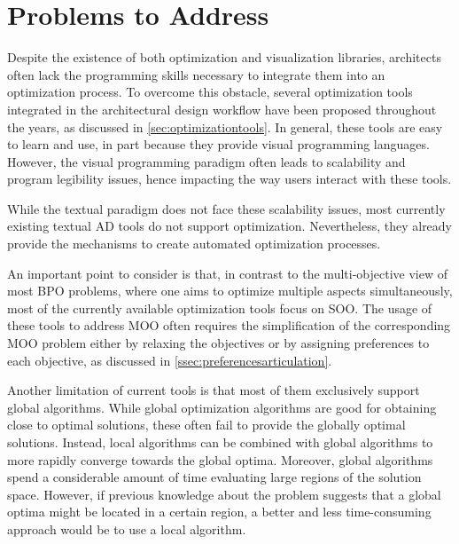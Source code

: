 	\section{Problems to Address}
	\label{sec:problemsaddress}
	
	Despite the existence of both optimization and visualization libraries, architects often lack the programming skills necessary to integrate them into an optimization process. To overcome this obstacle, 
	several optimization tools integrated in the architectural design workflow have been proposed throughout the years, as discussed in \cref{sec:optimizationtools}. In general, these tools are easy to learn and use, in part because they provide  visual programming languages. However, the visual programming paradigm often leads to scalability and program legibility issues, hence impacting the way users interact with these tools. 
	
	While the textual paradigm does not face these scalability issues, most currently existing textual \ac{AD} tools do not support optimization. Nevertheless, they already provide the mechanisms to create automated optimization processes.
	
	An important point to consider is that, in contrast to the multi-objective view of most \ac{BPO} problems, where one aims to optimize multiple aspects simultaneously, most of the currently available optimization tools focus on \ac{SOO}. The usage of these tools to address \ac{MOO} often requires the simplification of the corresponding \ac{MOO} problem either by relaxing the objectives or by assigning preferences to each objective, as discussed in \cref{ssec:preferencesarticulation}.
	
	Another limitation of current tools is that most of them exclusively support global algorithms. While global optimization algorithms are good for obtaining close to optimal solutions, these often fail to provide the globally optimal solutions. Instead, local algorithms can be combined with global algorithms to more rapidly converge towards the global optima. Moreover, global algorithms spend a considerable amount of time evaluating large regions of the solution space. However, if previous knowledge about the problem suggests that a global optima might be located in a certain region, a better and less time-consuming approach would be to use a local algorithm.
	
